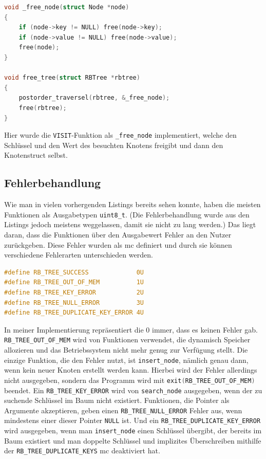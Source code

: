 \documentclass[11pt]{article}
\newcommand{\lstin}[1]{\lstinline[language=C]{#1}}
\begin{document}
\begin{lstlisting}[language=C]
void _free_node(struct Node *node)
{
    if (node->key != NULL) free(node->key);
    if (node->value != NULL) free(node->value);
    free(node);
}

void free_tree(struct RBTree *rbtree)
{
    postorder_traversel(rbtree, &_free_node);
    free(rbtree);
}
\end{lstlisting}

Hier wurde die \lstin{VISIT}-Funktion als \lstin{_free_node} implementiert, welche den Schlüssel und den Wert des besuchten Knotens freigibt und dann den Knotenstruct selbst.

\subsection{Fehlerbehandlung} \label{err}
Wie man in vielen vorhergenden Listings bereits sehen konnte, haben die meisten Funktionen als Ausgabetypen \lstin{uint8_t}. (Die Fehlerbehandlung wurde aus den Listings jedoch meistens weggelassen, damit sie nicht zu lang werden.)
Das liegt daran, dass die Funktionen über den Ausgabewert Fehler an den Nutzer zurückgeben. Diese Fehler wurden als \gls{mc} definiert und durch sie können verschiedene Fehlerarten unterschieden werden.

\begin{lstlisting}[language=C]
#define RB_TREE_SUCCESS             0U
#define RB_TREE_OUT_OF_MEM          1U
#define RB_TREE_KEY_ERROR           2U
#define RB_TREE_NULL_ERROR          3U
#define RB_TREE_DUPLICATE_KEY_ERROR 4U
\end{lstlisting}

In meiner Implementierung repräsentiert die 0 immer, dass es keinen Fehler gab.
\lstin{RB_TREE_OUT_OF_MEM} wird von Funktionen verwendet, die dynamisch Speicher allozieren und das Betriebssystem nicht mehr genug zur Verfügung stellt.
Die einzige Funktion, die den Fehler nutzt, ist \lstin{insert_node}, nämlich genau dann, wenn kein neuer Knoten erstellt werden kann.
Hierbei wird der Fehler allerdings nicht ausgegeben, sondern das Programm wird mit \lstin{exit(RB_TREE_OUT_OF_MEM)} beendet.
Ein \lstin{RB_TREE_KEY_ERROR} wird von \lstin{search_node} ausgegeben, wenn der zu suchende Schlüssel im Baum nicht existiert.
Funktionen, die Pointer als Argumente akzeptieren, geben einen \lstin{RB_TREE_NULL_ERROR} Fehler aus, wenn mindestens einer dieser Pointer \lstin{NULL} ist.
Und ein \lstin{RB_TREE_DUPLICATE_KEY_ERROR} wird ausgegeben, wenn man \lstin{insert_node} einen Schlüssel übergibt, der bereits im Baum existiert und man doppelte Schlüssel und implizites Überschreiben mithilfe der \lstin{RB_TREE_DUPLICATE_KEYS} \gls{mc} deaktiviert hat.
\end{document}
